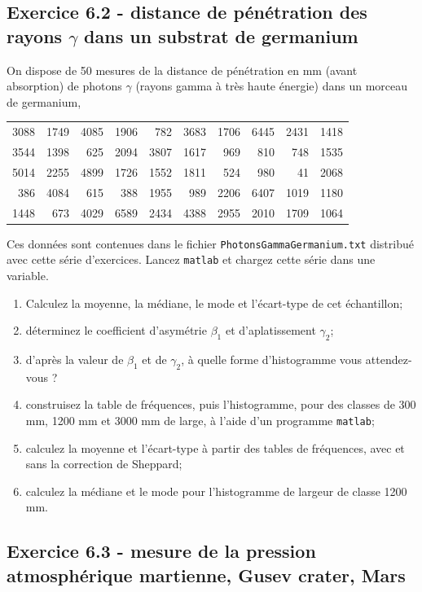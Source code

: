 \subsection*{Exercice 6.2 - distance de pénétration des rayons $\gamma$ dans un substrat de germanium}

On dispose de 50 mesures de la distance de pénétration en mm (avant absorption) de photons $\gamma$ (rayons gamma à très haute énergie) dans un morceau de germanium,
\begin{center}
\begin{tabular}{|r|r|r|r|r|r|r|r|r|r|}
3088 & 1749 & 4085 & 1906 & 782 & 3683 & 1706 & 6445 & 2431 & 1418 \\
3544 & 1398 & 625 & 2094 & 3807 & 1617 & 969 & 810 & 748 & 1535 \\
5014 & 2255 & 4899 & 1726 & 1552 & 1811 & 524 & 980 & 41 & 2068 \\
386 & 4084 & 615 & 388 & 1955 & 989 & 2206 & 6407 & 1019 & 1180 \\
1448 & 673 & 4029 & 6589 & 2434 & 4388 & 2955 & 2010 & 1709 & 1064
\end{tabular}
\end{center}
Ces données sont contenues dans le fichier \texttt{PhotonsGammaGermanium.txt} distribué avec cette série d'exercices. Lancez \texttt{matlab} et chargez cette série dans une variable.
\begin{enumerate}
\item Calculez la moyenne, la médiane, le mode et l'écart-type de cet échantillon;
\item déterminez le coefficient d'asymétrie $\beta_1$ et d'aplatissement $\gamma_2$;
\item d'après la valeur de $\beta_1$ et de $\gamma_2$, à quelle forme d'histogramme vous attendez-vous ?
\item construisez la table de fréquences, puis l'histogramme, pour des classes de 300 mm, 1200 mm et 3000 mm de large, à l'aide d'un programme \texttt{matlab};
\item calculez la moyenne et l'écart-type à partir des tables de fréquences, avec et sans la correction de Sheppard;
\item calculez la médiane et le mode pour l'histogramme de largeur de classe 1200 mm.
\end{enumerate}

\subsection*{Exercice 6.3 - mesure de la pression atmosphérique martienne, Gusev crater, Mars}

